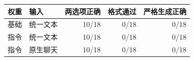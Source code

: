 \begin{center}\begin{tabular}{llrrr}\toprule
权重 & 输入 & 两选项正确 & 格式通过 & 严格生成正确 \\ \midrule
基础 & 统一文本 & 10/18 & 0/18 & 0/18 \\
指令 & 统一文本 & 10/18 & 0/18 & 0/18 \\
指令 & 原生聊天 & 10/18 & 0/18 & 0/18 \\
\bottomrule\end{tabular}\end{center}
